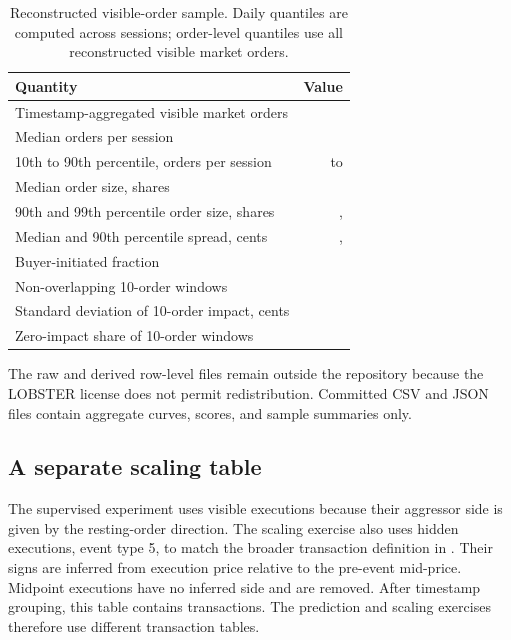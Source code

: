 \documentclass[11pt,a4paper]{article}
\begin{document}
\begin{table}[H]
  \centering
  \caption{Reconstructed visible-order sample. Daily quantiles are computed
  across \Sessions{} sessions; order-level quantiles use all reconstructed
  visible market orders.}
  \label{tab:sample}
  \begin{tabular}{lr}
    \toprule
    Quantity & Value \\
    \midrule
    Timestamp-aggregated visible market orders & \VisibleOrders{} \\
    Median orders per session & \MedianDailyOrders{} \\
    10th to 90th percentile, orders per session & \PtenDailyOrders{} to \PninetyDailyOrders{} \\
    Median order size, shares & \MedianOrderSize{} \\
    90th and 99th percentile order size, shares & \PninetyOrderSize{}, \PninetynineOrderSize{} \\
    Median and 90th percentile spread, cents & \MedianSpread{}, \PninetySpread{} \\
    Buyer-initiated fraction & \BuyerFraction{} \\
    Non-overlapping 10-order windows & \TenOrderWindows{} \\
    Standard deviation of 10-order impact, cents & \TenOrderImpactSd{} \\
    Zero-impact share of 10-order windows & \ZeroImpactFraction{} \\
    \bottomrule
  \end{tabular}
\end{table}

The raw and derived row-level files remain outside the repository because the
LOBSTER license does not permit redistribution. Committed CSV and JSON files
contain aggregate curves, scores, and sample summaries only.

\subsection{A separate scaling table}

The supervised experiment uses visible executions because their aggressor side
is given by the resting-order direction. The scaling exercise also uses hidden
executions, event type 5, to match the broader transaction definition in
\citet{patzelt2018}. Their signs are inferred from execution price relative to
the pre-event mid-price. Midpoint executions have no inferred side and are
removed. After timestamp grouping, this table contains \ScalingTransactions{}
transactions. The prediction and scaling exercises therefore use different
transaction tables.
\end{document}
